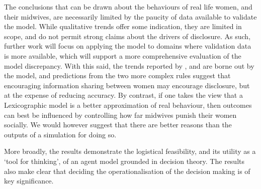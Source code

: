 The conclusions that can be drawn about the behaviours of real life women, and their midwives, are necessarily limited by the paucity of data available to validate the model. While qualitative trends offer some indication, they are limited in scope, and do not permit strong claims about the drivers of disclosure.  As such, further work will focus on applying the model to domains where validation data is more available, which will support a more comprehensive evaluation of the model discrepancy. 
With this said, the trends reported by \citet{Alvik2006}, and \citet{Phillips2007} are borne out by the model, and predictions from the two more complex rules suggest that encouraging information sharing between women may encourage disclosure, but at the expense of reducing accuracy. By contrast, if one takes the view that a Lexicographic model is a better approximation of real behaviour, then outcomes can best be influenced by controlling how far midwives punish their women socially. We would however suggest that there are better reasons than the outputs of a simulation for doing so.

More broadly, the results demonstrate the logistical feasibility, and its utility as a `tool for thinking', of an agent model grounded in decision theory. The results also make clear that deciding the operationalisation of the decision making is of key significance.

